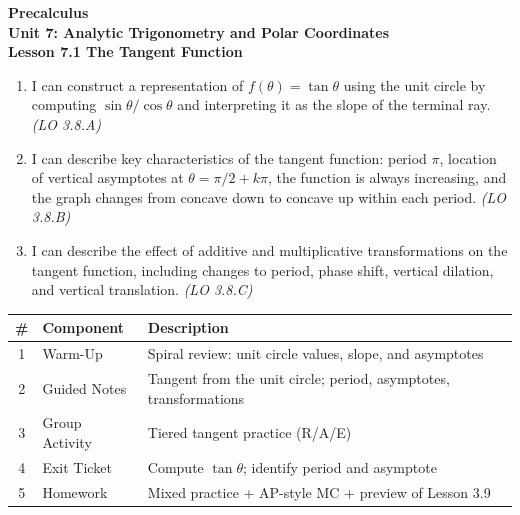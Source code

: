 \documentclass[10pt]{article}
\begin{document}
\vspace{-0.8in}

\begin{center}
  {\color{white}\textbf{\LARGE Precalculus}}\\[4pt]
  {\color{skymid}\large\textbf{Unit 7: Analytic Trigonometry and Polar Coordinates}}\\[6pt]
  {\color{white}\textbf{\large Lesson 7.1 \quad The Tangent Function}}
\end{center}

\vspace{0.22in}
\namedateperiod
\vspace{0.18in}

\begin{learningtargetbox}
\small
\begin{enumerate}[leftmargin=1.5em, itemsep=5pt]
  \item I can construct a representation of $f(\theta)=\tan\theta$ using the unit
    circle by computing $\sin\theta/\cos\theta$ and interpreting it as the slope of
    the terminal ray. \hfill\textit{(LO 3.8.A)}
  \item I can describe key characteristics of the tangent function: period $\pi$,
    location of vertical asymptotes at $\theta=\pi/2+k\pi$, the function is always
    increasing, and the graph changes from concave down to concave up within each
    period. \hfill\textit{(LO 3.8.B)}
  \item I can describe the effect of additive and multiplicative transformations on
    the tangent function, including changes to period, phase shift, vertical dilation,
    and vertical translation. \hfill\textit{(LO 3.8.C)}
\end{enumerate}
\end{learningtargetbox}

\vspace{0.14in}

\begin{tocbox}
\small
\renewcommand{\arraystretch}{1.5}
\begin{tabularx}{\linewidth}{@{} c l X @{}}
\rowcolor{sky}
\textbf{\#} & \textbf{Component} & \textbf{Description} \\
\midrule
1 & Warm-Up        & Spiral review: unit circle values, slope, and asymptotes \\
2 & Guided Notes   & Tangent from the unit circle; period, asymptotes, transformations \\
3 & Group Activity & Tiered tangent practice (R/A/E) \\
4 & Exit Ticket    & Compute $\tan\theta$; identify period and asymptote \\
5 & Homework       & Mixed practice + AP-style MC + preview of Lesson 3.9 \\
\end{tabularx}
\end{tocbox}
\end{document}
